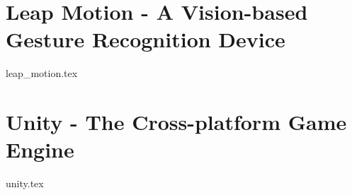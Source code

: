 \section{Leap Motion - A Vision-based Gesture Recognition Device}
{leap_motion.tex}

\section{Unity - The Cross-platform Game Engine}
{unity.tex}